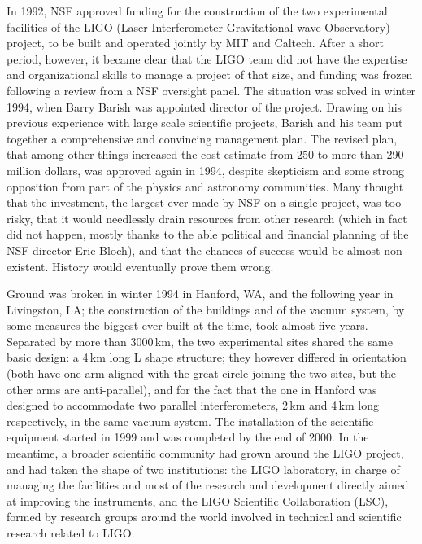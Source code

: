 In 1992, NSF approved funding for the construction of the two experimental facilities of the LIGO (Laser Interferometer Gravitational-wave Observatory) project\cite{Abramovici_1992}, to be built and operated jointly by MIT and Caltech.
After a short period, however, it became clear that the LIGO team did not have the expertise and organizational skills to manage a project of that size, and funding was frozen following a review from a NSF oversight panel.
The situation was solved in winter 1994, when Barry Barish was appointed director of the project. Drawing on his previous experience with large scale scientific projects, Barish and his team put together a comprehensive and convincing management plan.
The revised plan, that among other things increased the cost estimate from 250 to more than 290 million dollars, was approved again in 1994, despite skepticism and some strong opposition from part of the physics and astronomy communities. 
Many thought that the investment, the largest ever made by NSF on a  single project, was too risky, that it would needlessly drain resources from other research (which in fact did not happen, mostly thanks to the able political and financial planning of the NSF director Eric Bloch), and that the chances of success would be almost non existent.
History would eventually prove them wrong.

Ground was broken in winter 1994 in Hanford, WA, and the following year in Livingston, LA; 
the construction of the buildings and of the vacuum system, by some measures the biggest 
ever built at the time, took almost five years. Separated by more than 3000\,km, the two 
experimental sites shared the same basic design: a 4\,km long L shape structure; they 
however differed in orientation (both have one arm aligned with the great circle joining the two sites, but the other arms are anti-parallel), and for the fact that the one in Hanford was 
designed to accommodate two parallel interferometers, 2\,km and 4\,km long respectively, in the same vacuum system. 
The installation of the scientific equipment started in 1999 and was completed by the end of 2000. 
In the meantime, a broader scientific community had grown around the LIGO project, 
and had taken the shape of two institutions: the LIGO laboratory, in charge of managing 
the facilities and most of the research and development directly aimed at improving the 
instruments, and the LIGO Scientific Collaboration (LSC), formed by research groups 
around the world involved in technical and scientific research related to LIGO.

